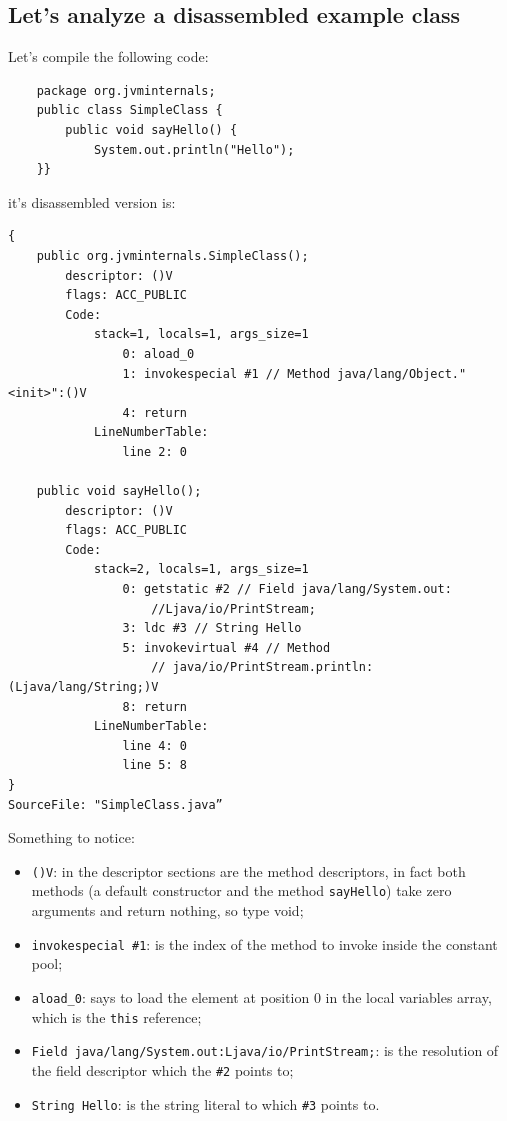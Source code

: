 \subsection{Let's analyze a disassembled example class}
Let's compile the following code:
\begin{verbatim}
    package org.jvminternals;
    public class SimpleClass {
        public void sayHello() {
            System.out.println("Hello");
    }}
\end{verbatim}
it's disassembled version is:
\begin{verbatim}
{
    public org.jvminternals.SimpleClass();
        descriptor: ()V
        flags: ACC_PUBLIC
        Code:
            stack=1, locals=1, args_size=1
                0: aload_0
                1: invokespecial #1 // Method java/lang/Object."<init>":()V
                4: return
            LineNumberTable:
                line 2: 0

    public void sayHello();
        descriptor: ()V
        flags: ACC_PUBLIC
        Code:
            stack=2, locals=1, args_size=1
                0: getstatic #2 // Field java/lang/System.out:
                    //Ljava/io/PrintStream;
                3: ldc #3 // String Hello
                5: invokevirtual #4 // Method 
                    // java/io/PrintStream.println:(Ljava/lang/String;)V
                8: return
            LineNumberTable:
                line 4: 0
                line 5: 8
}
SourceFile: "SimpleClass.java”
\end{verbatim}
Something to notice:
\begin{itemize}
    \item \verb|()V|: in the descriptor sections are the method descriptors, in fact both methods (a default constructor and the method \verb|sayHello|) take zero arguments and return nothing, so type void;
    \item \verb|invokespecial #1|: is the index of the method to invoke inside the constant pool;
    \item \verb|aload_0|: says to load the element at position 0 in the local variables array, which is the \verb|this| reference;
    \item \verb|Field java/lang/System.out:Ljava/io/PrintStream;|: is the resolution of the field descriptor which the \verb|#2| points to;
    \item \verb|String Hello|: is the string literal to which \verb|#3| points to.
\end{itemize}

